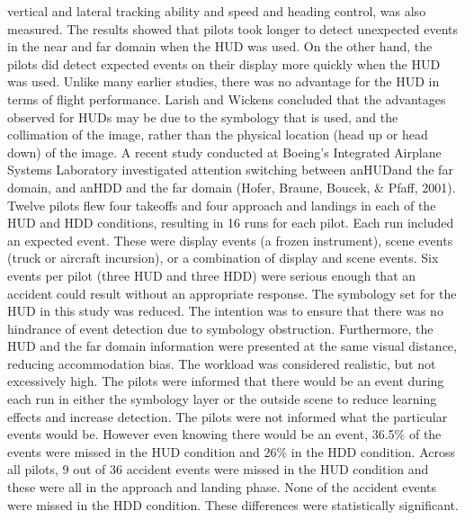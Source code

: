 \documentclass[utf8,bachelor,manualbib]{gradu3}
\begin{document}
vertical and lateral tracking ability and speed and heading control, was also measured.
The results showed that pilots took longer to detect unexpected events in the
near and far domain when the HUD was used. On the other hand, the pilots did detect
expected events on their display more quickly when the HUD was used. Unlike
many earlier studies, there was no advantage for the HUD in terms of flight
performance. Larish and Wickens concluded that the advantages observed for
HUDs may be due to the symbology that is used, and the collimation of the image,
rather than the physical location (head up or head down) of the image.
A recent study conducted at Boeing’s Integrated Airplane Systems Laboratory
investigated attention switching between anHUDand the far domain, and anHDD
and the far domain (Hofer, Braune, Boucek, \& Pfaff, 2001). Twelve pilots flew
four takeoffs and four approach and landings in each of the HUD and HDD conditions,
resulting in 16 runs for each pilot. Each run included an expected event.
These were display events (a frozen instrument), scene events (truck or aircraft incursion),
or a combination of display and scene events. Six events per pilot (three
HUD and three HDD) were serious enough that an accident could result without an
appropriate response. The symbology set for the HUD in this study was reduced.
The intention was to ensure that there was no hindrance of event detection due to
symbology obstruction. Furthermore, the HUD and the far domain information
were presented at the same visual distance, reducing accommodation bias. The
workload was considered realistic, but not excessively high. The pilots were informed
that there would be an event during each run in either the symbology layer
or the outside scene to reduce learning effects and increase detection. The pilots
were not informed what the particular events would be. However even knowing
there would be an event, 36.5\% of the events were missed in the HUD condition
and 26\% in the HDD condition. Across all pilots, 9 out of 36 accident events were
missed in the HUD condition and these were all in the approach and landing phase.
None of the accident events were missed in the HDD condition. These differences
were statistically significant. \citep{crawford2006}
\end{document}
